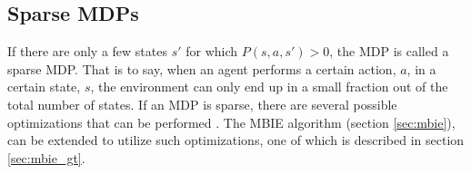 \subsection{Sparse MDPs }

If there are only a few states $s'$ for which $P(s, a, s') > 0$, the MDP is called a sparse MDP. That is to say, when an agent performs a certain action, $a$, in a certain state, $s$, the environment can only end up in a small fraction out of the total number of states. If an MDP is sparse, there are several possible optimizations that can be performed \parencite{dietterich2013pac}. The MBIE algorithm (section \ref{sec:mbie}), can be extended to utilize such optimizations, one of which is described in section \ref{sec:mbie_gt}. 